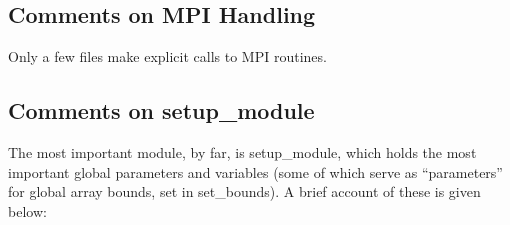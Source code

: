 \subsection{Comments on MPI Handling}

Only a few files make explicit calls to MPI routines.

\subsection{Comments on {\sc setup\_module}}
\label{parameters}

The most important module, by far, is {\sc setup\_module}, which
holds the most important global parameters and variables (some of
which serve as ``parameters'' for global array bounds, set in {\sc
set\_bounds}). A brief account of these is given below:


